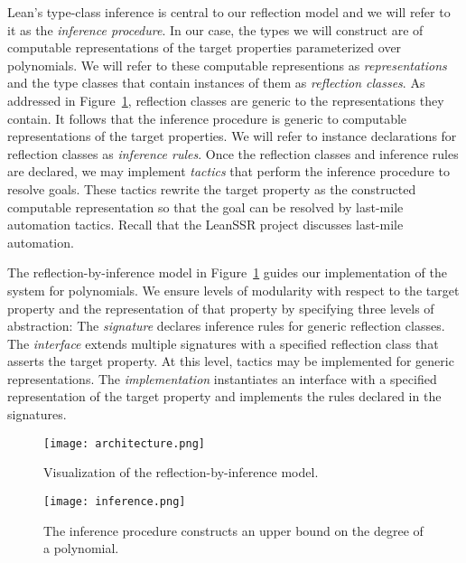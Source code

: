 Lean's type-class inference is central to our reflection model and we will refer to it as the \emph{inference procedure}. In our case, the types we will construct are of computable representations of the target properties parameterized over polynomials. We will refer to these computable representions as \emph{representations} and the type classes that contain instances of them as \emph{reflection classes}. As addressed in Figure~\ref{fig:model}, reflection classes are generic to the representations they contain. It follows that the inference procedure is generic to computable representations of the target properties. We will refer to instance declarations for reflection classes as \emph{inference rules}. Once the reflection classes and inference rules are declared, we may implement \emph{tactics} that perform the inference procedure to resolve goals. These tactics rewrite the target property as the constructed computable representation so that the goal can be resolved by last-mile automation tactics. Recall that the LeanSSR project \cite{SmallScaleReflection2024} discusses last-mile automation.


The reflection-by-inference model in Figure~\ref{fig:model} guides our implementation of the system for polynomials. We ensure levels of modularity with respect to the target property and the representation of that property by specifying three levels of abstraction: The \emph{signature} declares inference rules for generic reflection classes. The \emph{interface} extends multiple signatures with a specified reflection class that asserts the target property. At this level, tactics may be implemented for generic representations. The \emph{implementation} instantiates an interface with a specified representation of the target property and implements the rules declared in the signatures.

\begin{figure}
\centering
\caption{Visualization of the reflection-by-inference model.}
\label{fig:model}
\texttt{[image: architecture.png]}
\end{figure}

\begin{figure}
\centering
\caption{The inference procedure constructs an upper bound on the degree of a polynomial.}
\label{fig:inference}
\texttt{[image: inference.png]}
\end{figure}

\label{sec:sensitive}

